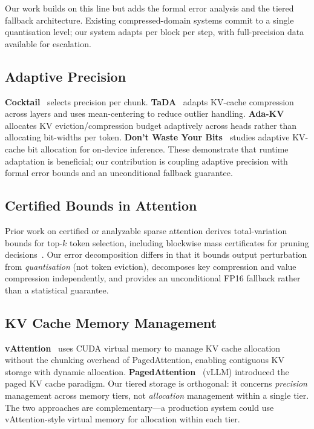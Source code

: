 \documentclass[11pt,a4paper]{article}
\theoremstyle{definition}
\theoremstyle{remark}
\begin{document}
Our work builds on this line but adds the formal error analysis and the tiered fallback architecture.  Existing compressed-domain systems commit to a single quantisation level; our system adapts per block per step, with full-precision data available for escalation.

\subsection{Adaptive Precision}

\textbf{Cocktail}~\cite{cocktail} selects precision per chunk.  \textbf{TaDA}~\cite{tada} adapts KV-cache compression across layers and uses mean-centering to reduce outlier handling.  \textbf{Ada-KV}~\cite{adakv} allocates KV eviction/compression budget adaptively across heads rather than allocating bit-widths per token.  \textbf{Don't Waste Your Bits}~\cite{dontwastebits} studies adaptive KV-cache bit allocation for on-device inference.  These demonstrate that runtime adaptation is beneficial; our contribution is coupling adaptive precision with formal error bounds and an unconditional fallback guarantee.

\subsection{Certified Bounds in Attention}

Prior work on certified or analyzable sparse attention derives total-variation bounds for top-$k$ token selection, including blockwise mass certificates for pruning decisions~\cite{certifiedtopk}.  Our error decomposition differs in that it bounds output perturbation from \emph{quantisation} (not token eviction), decomposes key compression and value compression independently, and provides an unconditional FP16 fallback rather than a statistical guarantee.

\subsection{KV Cache Memory Management}

\textbf{vAttention}~\cite{vattention} uses CUDA virtual memory to manage KV cache allocation without the chunking overhead of PagedAttention, enabling contiguous KV storage with dynamic allocation.  \textbf{PagedAttention}~\cite{pagedattn} (vLLM) introduced the paged KV cache paradigm.  Our tiered storage is orthogonal: it concerns \emph{precision} management across memory tiers, not \emph{allocation} management within a single tier.  The two approaches are complementary---a production system could use vAttention-style virtual memory for allocation within each tier.
\end{document}
